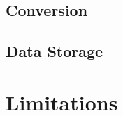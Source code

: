 \subsection{Conversion}

\FloatBarrier


%

\subsection{Data Storage}

\FloatBarrier

\section{Limitations}

